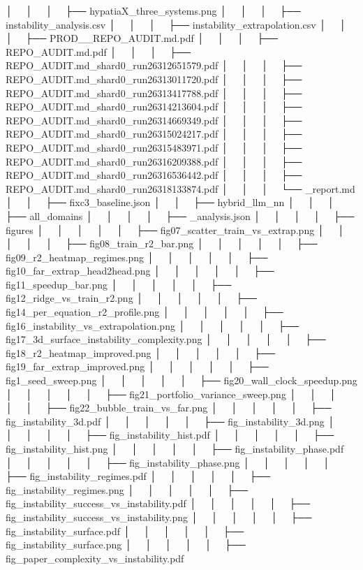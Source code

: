 │   │       │   ├── hypatiaX_three_systems.png
│   │       │   ├── instability_analysis.csv
│   │       │   ├── instability_extrapolation.csv
│   │       │   ├── PROD__REPO_AUDIT.md.pdf
│   │       │   ├── REPO_AUDIT.md.pdf
│   │       │   ├── REPO_AUDIT.md_shard0_run26312651579.pdf
│   │       │   ├── REPO_AUDIT.md_shard0_run26313011720.pdf
│   │       │   ├── REPO_AUDIT.md_shard0_run26313417788.pdf
│   │       │   ├── REPO_AUDIT.md_shard0_run26314213604.pdf
│   │       │   ├── REPO_AUDIT.md_shard0_run26314669349.pdf
│   │       │   ├── REPO_AUDIT.md_shard0_run26315024217.pdf
│   │       │   ├── REPO_AUDIT.md_shard0_run26315483971.pdf
│   │       │   ├── REPO_AUDIT.md_shard0_run26316209388.pdf
│   │       │   ├── REPO_AUDIT.md_shard0_run26316536442.pdf
│   │       │   ├── REPO_AUDIT.md_shard0_run26318133874.pdf
│   │       │   └── _report.md
│   │       ├── fixc3_baseline.json
│   │       ├── hybrid_llm_nn
│   │       │   ├── all_domains
│   │       │   │   ├── _analysis.json
│   │       │   │   ├── figures
│   │       │   │   │   ├── fig07_scatter_train_vs_extrap.png
│   │       │   │   │   ├── fig08_train_r2_bar.png
│   │       │   │   │   ├── fig09_r2_heatmap_regimes.png
│   │       │   │   │   ├── fig10_far_extrap_head2head.png
│   │       │   │   │   ├── fig11_speedup_bar.png
│   │       │   │   │   ├── fig12_ridge_vs_train_r2.png
│   │       │   │   │   ├── fig14_per_equation_r2_profile.png
│   │       │   │   │   ├── fig16_instability_vs_extrapolation.png
│   │       │   │   │   ├── fig17_3d_surface_instability_complexity.png
│   │       │   │   │   ├── fig18_r2_heatmap_improved.png
│   │       │   │   │   ├── fig19_far_extrap_improved.png
│   │       │   │   │   ├── fig1_seed_sweep.png
│   │       │   │   │   ├── fig20_wall_clock_speedup.png
│   │       │   │   │   ├── fig21_portfolio_variance_sweep.png
│   │       │   │   │   ├── fig22_bubble_train_vs_far.png
│   │       │   │   │   ├── fig_instability_3d.pdf
│   │       │   │   │   ├── fig_instability_3d.png
│   │       │   │   │   ├── fig_instability_hist.pdf
│   │       │   │   │   ├── fig_instability_hist.png
│   │       │   │   │   ├── fig_instability_phase.pdf
│   │       │   │   │   ├── fig_instability_phase.png
│   │       │   │   │   ├── fig_instability_regimes.pdf
│   │       │   │   │   ├── fig_instability_regimes.png
│   │       │   │   │   ├── fig_instability_success_vs_instability.pdf
│   │       │   │   │   ├── fig_instability_success_vs_instability.png
│   │       │   │   │   ├── fig_instability_surface.pdf
│   │       │   │   │   ├── fig_instability_surface.png
│   │       │   │   │   ├── fig_paper_complexity_vs_instability.pdf
